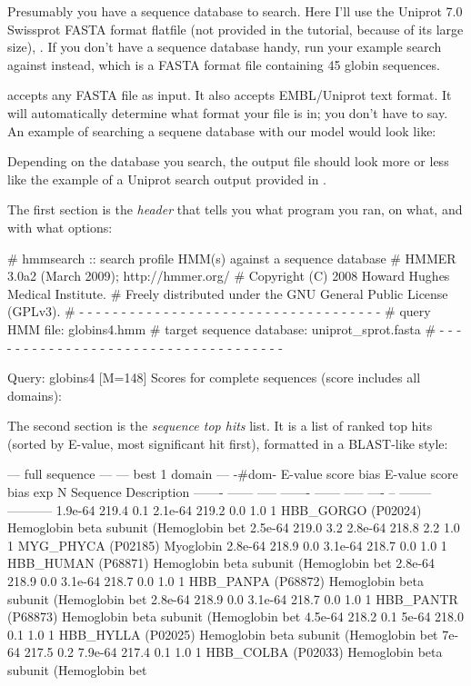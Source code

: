 Presumably you have a sequence database to search. Here I'll use the
Uniprot 7.0 Swissprot FASTA format flatfile (not provided in the
tutorial, because of its large size), .  If
you don't have a sequence database handy, run your example search
against  instead, which is a FASTA format
file containing 45 globin sequences.

 accepts any FASTA file as input. It also accepts
EMBL/Uniprot text format. It will automatically determine what format
your file is in; you don't have to say. An example of searching a
sequene database with our  model would look like:


Depending on the database you search, the output file
 should look more or less like the example of a
Uniprot search output provided in .

The first section is the \emph{header} that tells you what program you
ran, on what, and with what options:

\begin{sreoutput}
# hmmsearch :: search profile HMM(s) against a sequence database
# HMMER 3.0a2 (March 2009); http://hmmer.org/
# Copyright (C) 2008 Howard Hughes Medical Institute.
# Freely distributed under the GNU General Public License (GPLv3).
# - - - - - - - - - - - - - - - - - - - - - - - - - - - - - - - - - - - -
# query HMM file:                  globins4.hmm
# target sequence database:        uniprot_sprot.fasta
# - - - - - - - - - - - - - - - - - - - - - - - - - - - - - - - - - - - -

Query:       globins4  [M=148]
Scores for complete sequences (score includes all domains):
\end{sreoutput}

The second section is the \emph{ sequence top hits} list. It is a list
of ranked top hits (sorted by E-value, most significant hit first),
formatted in a BLAST-like style:

\begin{sreoutput}
   --- full sequence ---   --- best 1 domain ---    -#dom-
    E-value  score  bias    E-value  score  bias    exp  N  Sequence    Description
    ------- ------ -----    ------- ------ -----   ---- --  --------    -----------
    1.9e-64  219.4   0.1    2.1e-64  219.2   0.0    1.0  1  HBB_GORGO   (P02024) Hemoglobin beta subunit (Hemoglobin bet
    2.5e-64  219.0   3.2    2.8e-64  218.8   2.2    1.0  1  MYG_PHYCA   (P02185) Myoglobin
    2.8e-64  218.9   0.0    3.1e-64  218.7   0.0    1.0  1  HBB_HUMAN   (P68871) Hemoglobin beta subunit (Hemoglobin bet
    2.8e-64  218.9   0.0    3.1e-64  218.7   0.0    1.0  1  HBB_PANPA   (P68872) Hemoglobin beta subunit (Hemoglobin bet
    2.8e-64  218.9   0.0    3.1e-64  218.7   0.0    1.0  1  HBB_PANTR   (P68873) Hemoglobin beta subunit (Hemoglobin bet
    4.5e-64  218.2   0.1      5e-64  218.0   0.1    1.0  1  HBB_HYLLA   (P02025) Hemoglobin beta subunit (Hemoglobin bet
      7e-64  217.5   0.2    7.9e-64  217.4   0.1    1.0  1  HBB_COLBA   (P02033) Hemoglobin beta subunit (Hemoglobin bet
 \end{sreoutput}

